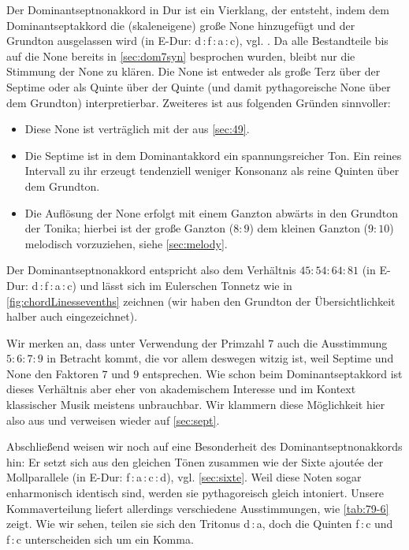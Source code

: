 Der Dominantseptnonakkord in Dur ist ein Vierklang, der entsteht, indem dem
Dominantseptakkord die (skaleneigene) große None hinzugefügt und der Grundton
ausgelassen wird (in \flat E-Dur: d\,:\,f\,:\,\flat a\,:\,c),
vgl. \cite[{}11.3]{Skript}.  Da alle Bestandteile bis auf die None bereits in
\cref{sec:dom7syn} besprochen wurden, bleibt nur die Stimmung der None zu
klären.  Die None ist entweder als große Terz über der Septime oder als Quinte
über der Quinte (und damit pythagoreische None über dem Grundton)
interpretierbar.  Zweiteres ist aus folgenden Gründen sinnvoller:
\begin{itemize}
\item Diese None ist verträglich mit der aus \cref{sec:49}.
  \item Die Septime ist in dem Dominantakkord ein spannungsreicher Ton.  Ein
  reines Intervall zu ihr erzeugt tendenziell weniger Konsonanz als reine
  Quinten über dem Grundton.
\item Die Auflösung der None erfolgt mit einem Ganzton abwärts in den Grundton
  der Tonika; hierbei ist der große Ganzton ($8:9$) dem kleinen Ganzton ($9:10$)
  melodisch vorzuziehen, siehe \cref{sec:melody}.
\end{itemize}
Der Dominantseptnonakkord entspricht also dem Verhältnis $45:54:64:81$ (in \flat
E-Dur: \naturalm d\,:\,f\,:\,\flat a\,:\,c) und lässt sich im Eulerschen Tonnetz
wie in \cref{fig:chordLinessevenths} zeichnen (wir haben den Grundton der
Übersichtlichkeit halber auch eingezeichnet).

Wir merken an, dass unter Verwendung der Primzahl $7$ auch die Ausstimmung
$5:6:7:9$ in Betracht kommt, die vor allem deswegen witzig ist, weil Septime und
None den Faktoren $7$ und $9$ entsprechen.  Wie schon beim Dominantseptakkord
ist dieses Verhältnis aber eher von akademischem Interesse und im Kontext
klassischer Musik meistens unbrauchbar. Wir klammern diese Möglichkeit hier also
aus und verweisen wieder auf \cref{sec:sept}.

Abschließend weisen wir noch auf eine Besonderheit des Dominantseptnonakkords
hin: Er setzt sich aus den gleichen Tönen zusammen wie der Sixte ajoutée der
Mollparallele (in \flat E-Dur: f\,:\,\flat a\,:\,c\,:\,d),
vgl. \cref{sec:sixte}. Weil diese Noten sogar enharmonisch identisch sind,
werden sie pythagoreisch gleich intoniert. Unsere Kommaverteilung liefert
allerdings verschiedene Ausstimmungen, wie \cref{tab:79-6} zeigt.  Wie wir
sehen, teilen sie sich den Tritonus \naturalm d\,:\,\flat a, doch die Quinten
f\,:\,c und \naturalm f\,:\,\naturalm c unterscheiden sich um ein Komma.

